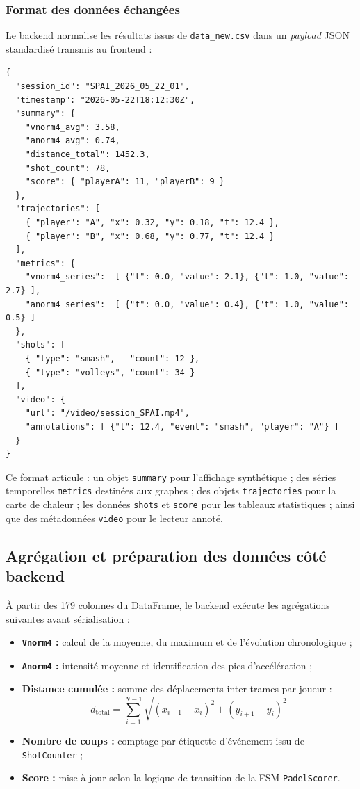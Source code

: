 \subsubsection{Format des données échangées}

Le backend normalise les résultats issus de \texttt{data\_new.csv} dans un
\textit{payload} JSON standardisé transmis au frontend :

{\small
\begin{verbatim}
{
  "session_id": "SPAI_2026_05_22_01",
  "timestamp": "2026-05-22T18:12:30Z",
  "summary": {
    "vnorm4_avg": 3.58,
    "anorm4_avg": 0.74,
    "distance_total": 1452.3,
    "shot_count": 78,
    "score": { "playerA": 11, "playerB": 9 }
  },
  "trajectories": [
    { "player": "A", "x": 0.32, "y": 0.18, "t": 12.4 },
    { "player": "B", "x": 0.68, "y": 0.77, "t": 12.4 }
  ],
  "metrics": {
    "vnorm4_series":  [ {"t": 0.0, "value": 2.1}, {"t": 1.0, "value": 2.7} ],
    "anorm4_series":  [ {"t": 0.0, "value": 0.4}, {"t": 1.0, "value": 0.5} ]
  },
  "shots": [
    { "type": "smash",   "count": 12 },
    { "type": "volleys", "count": 34 }
  ],
  "video": {
    "url": "/video/session_SPAI.mp4",
    "annotations": [ {"t": 12.4, "event": "smash", "player": "A"} ]
  }
}
\end{verbatim}
}

Ce format articule : un objet \texttt{summary} pour l'affichage synthétique ; des
séries temporelles \texttt{metrics} destinées aux graphes ; des objets
\texttt{trajectories} pour la carte de chaleur ; les données \texttt{shots} et
\texttt{score} pour les tableaux statistiques ; ainsi que des métadonnées
\texttt{video} pour le lecteur annoté.

\subsection{Agrégation et préparation des données côté backend}

À partir des 179 colonnes du DataFrame, le backend exécute les agrégations suivantes
avant sérialisation :

\begin{itemize}
  \item \textbf{\texttt{Vnorm4} :} calcul de la moyenne, du maximum et de l'évolution chronologique ;
  \item \textbf{\texttt{Anorm4} :} intensité moyenne et identification des pics d'accélération ;
  \item \textbf{Distance cumulée :} somme des déplacements inter-trames par joueur :
    \begin{equation}
      d_{\text{total}} = \sum_{i=1}^{N-1}
        \sqrt{(x_{i+1}-x_i)^2 + (y_{i+1}-y_i)^2}
      \label{eq:dist_total}
    \end{equation}
  \item \textbf{Nombre de coups :} comptage par étiquette d'événement issu de
        \texttt{ShotCounter} ;
  \item \textbf{Score :} mise à jour selon la logique de transition de la FSM
        \texttt{PadelScorer}.
\end{itemize}


